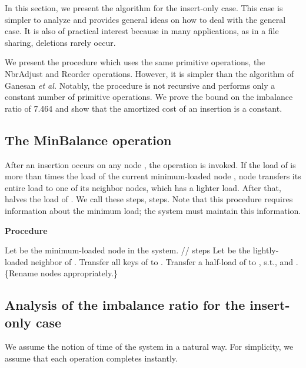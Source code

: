 \documentclass[a4paper]{article}
\begin{document}
In this section, we present the algorithm for the insert-only case.
This case is simpler to analyze and provides general ideas on how to
deal with the general case. It is also of practical interest because
in many applications, as in a file sharing, deletions rarely occur.

We present the {\minbalance} procedure which uses the same primitive
operations, the {\sc NbrAdjust} and {\sc Reorder} operations. However,
it is simpler than the algorithm {\adjload} of Ganesan {\em et al.}
Notably, the {\minbalance} procedure is not recursive and performs
only a constant number of primitive operations. We prove the bound on
the imbalance ratio of 7.464 and show that the
amortized cost of an insertion is a constant.

\subsection{The MinBalance operation}

After an insertion occurs on any node , the {\minbalance}
operation is invoked. If the load of  is more than  times
 the load of the current minimum-loaded node , node  transfers
its entire load to one of its neighbor nodes, which has a lighter load. 
After that,  halves the load of . We call these steps,  {\minbalance} steps.
Note that this procedure requires  information about the minimum
load; the system must maintain this information.

\begin{algorithm} {\bf Procedure} {\minbalance} 
  \begin{algorithmic}[1]
    \label{alg:minbalance}
    \STATE Let  be the minimum-loaded node in the system.
    \IF{} 
    \STATE //{\minbalance} steps 
    \STATE Let  be the lightly-loaded neighbor of . 
    \STATE Transfer all keys of  to . 
    \STATE Transfer a half-load of  to ,
    s.t.,  and .  
    \STATE \{Rename nodes appropriately.\}
    \ENDIF
  \end{algorithmic}
\end{algorithm}

\subsection{Analysis of the imbalance ratio for the insert-only case}

We assume the notion of time of the system in a natural way.  For
simplicity, we assume that each operation completes instantly.
\end{document}
